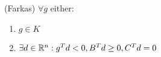 \begin{lemma} (Farkas)
    $\forall g$ either: 
    \begin{enumerate}
        \item $g \in K$
        \item $\exists d \in \mathbb{R}^n : g^T d < 0, B^T d \geq 0, C^T d = 0$
    \end{enumerate}
\end{lemma}